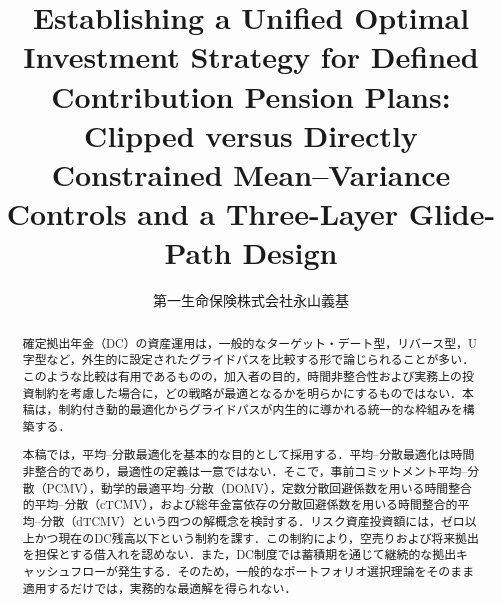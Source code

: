 \documentclass[10pt,a4paper]{article}
\title{Establishing a Unified Optimal Investment Strategy for Defined Contribution Pension Plans:\\
\large Clipped versus Directly Constrained Mean--Variance Controls and a Three-Layer Glide-Path Design}
\author{第一生命保険株式会社\quad 永山義基}
\date{}
\theoremstyle{plain}
\theoremstyle{definition}
\begin{document}
\maketitle

\begin{abstract}
\begin{sloppypar}
確定拠出年金（DC）の資産運用は，一般的なターゲット・デート型，リバース型，U字型など，外生的に設定されたグライドパスを比較する形で論じられることが多い．このような比較は有用であるものの，加入者の目的，時間非整合性および実務上の投資制約を考慮した場合に，どの戦略が最適となるかを明らかにするものではない．本稿は，制約付き動的最適化からグライドパスが内生的に導かれる統一的な枠組みを構築する．

本稿では，平均--分散最適化を基本的な目的として採用する．平均--分散最適化は時間非整合的であり，最適性の定義は一意ではない．そこで，事前コミットメント平均--分散（PCMV），動学的最適平均--分散（DOMV），定数分散回避係数を用いる時間整合的平均--分散（cTCMV），および総年金富依存の分散回避係数を用いる時間整合的平均--分散（dTCMV）という四つの解概念を検討する．リスク資産投資額には，ゼロ以上かつ現在のDC残高以下という制約を課す．この制約により，空売りおよび将来拠出を担保とする借入れを認めない．また，DC制度では蓄積期を通じて継続的な拠出キャッシュフローが発生する．そのため，一般的なポートフォリオ選択理論をそのまま適用するだけでは，実務的な最適解を得られない．


\end{sloppypar}
\end{abstract}
\end{document}
